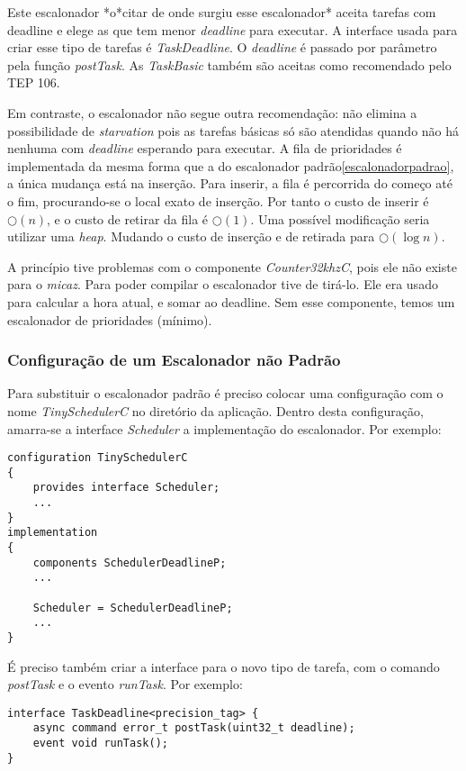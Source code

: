 \documentclass[a4paper,onecolumn, 10pt]{article}
\begin{document}
Este escalonador *o*citar de onde surgiu esse escalonador* aceita tarefas com deadline e 
elege as que tem menor \textit{deadline} para executar. A interface usada para criar
esse tipo de tarefas é \textit{TaskDeadline}. O \textit{deadline} é passado por parâmetro pela função \textit{postTask}.
As \textit{TaskBasic} também são aceitas como recomendado pelo TEP
106\cite{tep106}.

Em contraste, o escalonador não segue outra recomendação: não elimina a possibilidade de \textit{starvation} pois as tarefas
básicas só são atendidas quando não há nenhuma com \textit{deadline} esperando para executar. A fila de prioridades é
implementada da mesma forma que a do escalonador padrão\ref{escalonadorpadrao}, a única mudança está na inserção. Para
inserir, a fila é percorrida do começo até o fim, procurando-se o local exato de inserção.
Por tanto o custo de inserir é $\bigcirc(n)$, e o custo de retirar da fila é $\bigcirc(1)$. 
Uma possível modificação seria utilizar uma \textit{heap}. Mudando o custo de inserção e de retirada para $\bigcirc(\log
n)$.

A princípio tive problemas com o componente \textit{Counter32khzC}, 
pois ele não existe para o \textit{micaz}. Para poder compilar o
escalonador tive de tirá-lo. Ele era usado para calcular a hora atual, e somar ao deadline. Sem esse componente, temos
um escalonador de prioridades (mínimo). 

\subsubsection{Configuração de um Escalonador não Padrão}
Para substituir o escalonador padrão é preciso colocar uma configuração com o nome \textit{TinySchedulerC} no diretório
da aplicação. Dentro desta configuração, amarra-se a interface \textit{Scheduler} a implementação do escalonador. Por
exemplo:
\begin{lstlisting}
configuration TinySchedulerC 
{
    provides interface Scheduler;
    ...
}
implementation 
{
    components SchedulerDeadlineP;
    ...

    Scheduler = SchedulerDeadlineP;
    ...
}
\end{lstlisting}

É preciso também criar a interface para o novo tipo de tarefa, com o comando \textit{postTask} e o evento
\textit{runTask}. Por exemplo:
\begin{lstlisting}
interface TaskDeadline<precision_tag> { 
    async command error_t postTask(uint32_t deadline);
    event void runTask();
}
\end{lstlisting}
\end{document}
